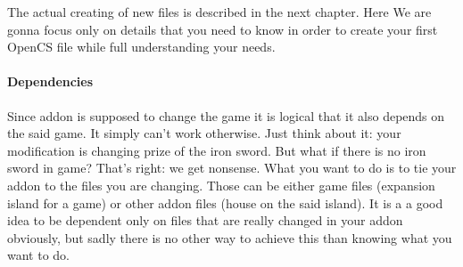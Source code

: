 
The actual creating of new files is described in the next chapter. Here We are gonna focus only on details that you need to know in order to create your first Open{CS} file while full understanding your needs.

\paragraph{Dependencies}
Since addon is supposed to change the game it is logical that it also depends on the said game. It simply can't work otherwise. Just think about it: your modification is changing prize of the iron sword. But what if there is no iron sword in game? That's right: we get nonsense. What you want to do is to tie your addon to the files you are changing. Those can be either game files (expansion island for a game) or other addon files (house on the said island). It is a a good idea to be dependent only on files that are really changed in your addon obviously, but sadly there is no other way to achieve this than knowing what you want to do.